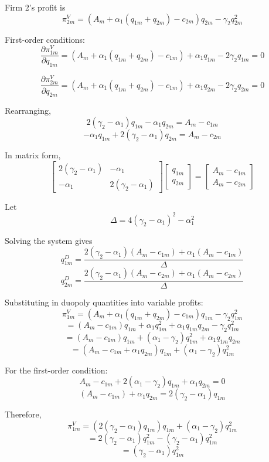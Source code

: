 \documentclass[12pt]{article}
\begin{document}
Firm 2's profit is
\[
\pi_{2m}^V = \left(A_m + \alpha_1(q_{1m}+q_{2m}) - c_{2m}\right)q_{2m} - \gamma_2 q_{2m}^2
\]

First-order conditions:
\[
\frac{\partial \pi_{1m}^V}{\partial q_{1m}}
= \left(A_m + \alpha_1(q_{1m}+q_{2m}) - c_{1m}\right) + \alpha_1 q_{1m} - 2\gamma_2q_{1m} = 0
\]

\[
\frac{\partial \pi_{2m}^V}{\partial q_{2m}}
= \left(A_m + \alpha_1(q_{1m}+q_{2m}) - c_{1m}\right) + \alpha_1 q_{2m} - 2\gamma_2q_{2m} = 0
\]

Rearranging,
\[
2(\gamma_2-\alpha_1)q_{1m} - \alpha_1 q_{2m} = A_m - c_{1m}
\]
\[
-\alpha_1 q_{1m} + 2(\gamma_2-\alpha_1)q_{2m} = A_m - c_{2m}
\]

In matrix form,
\[
\begin{bmatrix}
2(\gamma_2-\alpha_1) & -\alpha_1 \\
-\alpha_1 & 2(\gamma_2-\alpha_1)
\end{bmatrix}
\begin{bmatrix}
q_{1m} \\ q_{2m}
\end{bmatrix}
=
\begin{bmatrix}
A_m - c_{1m} \\ A_m - c_{2m}
\end{bmatrix}
\]

Let
\[
\Delta = 4(\gamma_2-\alpha_1)^2 - \alpha_1^2
\]

Solving the system gives
\[
q_{1m}^D = \frac{2(\gamma_2-\alpha_1)(A_m - c_{1m}) + \alpha_1 (A_m - c_{1m})}{\Delta}
\]
\[
q_{2m}^D = \frac{2(\gamma_2-\alpha_1)(A_m - c_{2m}) + \alpha_1 (A_m - c_{2m})}{\Delta}
\]


Substituting in duopoly quantities into variable profits:
\[
\pi_{1m}^V = \left(A_m + \alpha_1(q_{1m}+q_{2m}) - c_{1m}\right)q_{1m} - \gamma_2 q_{1m}^2
\]
\[
= (A_m-c_{1m})q_{1m} + \alpha_1 q_{1m}^2 + \alpha_1 q_{1m}q_{2m} - \gamma_2 q_{1m}^2
\]
\[
= (A_m-c_{1m})q_{1m} + (\alpha_1-\gamma_2)q_{1m}^2 + \alpha_1 q_{1m}q_{2m}
\]
\[
= (A_m-c_{1m} + \alpha_1 q_{2m})q_{1m} + (\alpha_1-\gamma_2)q_{1m}^2
\]


For the first-order condition:
\[
A_m-c_{1m} + 2(\alpha_1-\gamma_2)q_{1m} + \alpha_1 q_{2m} = 0
\]
\[
(A_m-c_{1m}) + \alpha_1 q_{2m} = 2(\gamma_2-\alpha_1)q_{1m}
\]

Therefore,
\[
\pi_{1m}^V
= (2(\gamma_2-\alpha_1)q_{1m})q_{1m} + (\alpha_1-\gamma_2)q_{1m}^2
\]
\[
= 2(\gamma_2-\alpha_1)q_{1m}^2 - (\gamma_2-\alpha_1)q_{1m}^2
\]
\[
= (\gamma_2-\alpha_1)q_{1m}^2
\]
\end{document}
